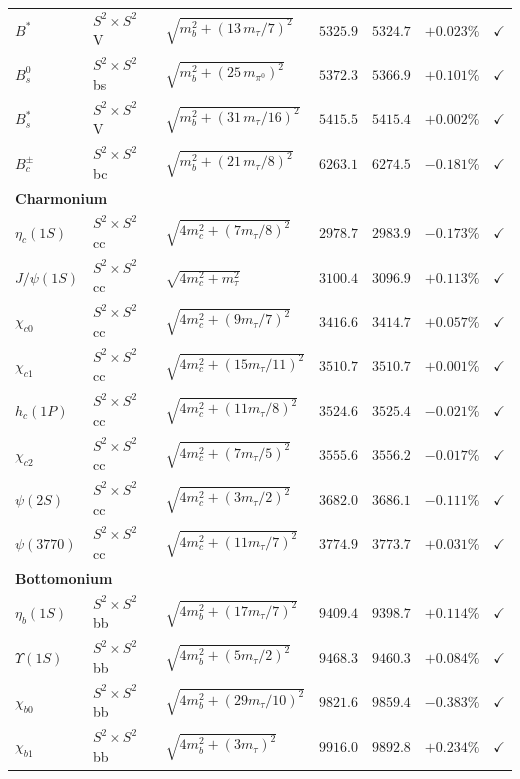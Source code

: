 \documentclass[11pt]{article}
\begin{document}
{\begin{longtable}{@{}p{1.2cm}p{2.4cm}p{4.8cm}p{1.6cm}p{1.4cm}rc@{}}
$B^*$ & $S^2\times S^2$ V & $\sqrt{m_b^2+(13\,m_\tau/7)^2}$ & $5325.9$ & $5324.7$ & $+0.023\%$ & $\checkmark$ \\
$B_s^0$ & $S^2\times S^2$ bs & $\sqrt{m_b^2+(25\,m_{\pi^0})^2}$ & $5372.3$ & $5366.9$ & $+0.101\%$ & $\checkmark$ \\
$B_s^*$ & $S^2\times S^2$ V & $\sqrt{m_b^2+(31\,m_\tau/16)^2}$ & $5415.5$ & $5415.4$ & $+0.002\%$ & $\checkmark$ \\
$B_c^\pm$ & $S^2\times S^2$ bc & $\sqrt{m_b^2+(21\,m_\tau/8)^2}$ & $6263.1$ & $6274.5$ & $-0.181\%$ & $\checkmark$ \\
\multicolumn{7}{l}{\textbf{Charmonium}} \\
$\eta_c(1S)$ & $S^2\times S^2$ cc & $\sqrt{4m_c^2+(7m_\tau/8)^2}$ & $2978.7$ & $2983.9$ & $-0.173\%$ & $\checkmark$ \\
$J/\psi(1S)$ & $S^2\times S^2$ cc & $\sqrt{4m_c^2+m_\tau^2}$ & $3100.4$ & $3096.9$ & $+0.113\%$ & $\checkmark$ \\
$\chi_{c0}$ & $S^2\times S^2$ cc & $\sqrt{4m_c^2+(9m_\tau/7)^2}$ & $3416.6$ & $3414.7$ & $+0.057\%$ & $\checkmark$ \\
$\chi_{c1}$ & $S^2\times S^2$ cc & $\sqrt{4m_c^2+(15m_\tau/11)^2}$ & $3510.7$ & $3510.7$ & $+0.001\%$ & $\checkmark$ \\
$h_c(1P)$ & $S^2\times S^2$ cc & $\sqrt{4m_c^2+(11m_\tau/8)^2}$ & $3524.6$ & $3525.4$ & $-0.021\%$ & $\checkmark$ \\
$\chi_{c2}$ & $S^2\times S^2$ cc & $\sqrt{4m_c^2+(7m_\tau/5)^2}$ & $3555.6$ & $3556.2$ & $-0.017\%$ & $\checkmark$ \\
$\psi(2S)$ & $S^2\times S^2$ cc & $\sqrt{4m_c^2+(3m_\tau/2)^2}$ & $3682.0$ & $3686.1$ & $-0.111\%$ & $\checkmark$ \\
$\psi(3770)$ & $S^2\times S^2$ cc & $\sqrt{4m_c^2+(11m_\tau/7)^2}$ & $3774.9$ & $3773.7$ & $+0.031\%$ & $\checkmark$ \\
\multicolumn{7}{l}{\textbf{Bottomonium}} \\
$\eta_b(1S)$ & $S^2\times S^2$ bb & $\sqrt{4m_b^2+(17m_\tau/7)^2}$ & $9409.4$ & $9398.7$ & $+0.114\%$ & $\checkmark$ \\
$\Upsilon(1S)$ & $S^2\times S^2$ bb & $\sqrt{4m_b^2+(5m_\tau/2)^2}$ & $9468.3$ & $9460.3$ & $+0.084\%$ & $\checkmark$ \\
$\chi_{b0}$ & $S^2\times S^2$ bb & $\sqrt{4m_b^2+(29m_\tau/10)^2}$ & $9821.6$ & $9859.4$ & $-0.383\%$ & $\checkmark$ \\
$\chi_{b1}$ & $S^2\times S^2$ bb & $\sqrt{4m_b^2+(3m_\tau)^2}$ & $9916.0$ & $9892.8$ & $+0.234\%$ & $\checkmark$ \\

\end{longtable}}
\end{document}
